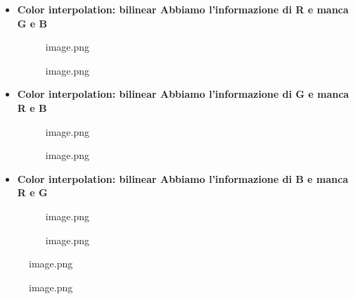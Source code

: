 \documentclass[
]{article}
\begin{document}
\begin{itemize}
\item
  \textbf{Color interpolation: bilinear
  Abbiamo l'informazione di R e manca G e B}

  \begin{figure}
  \centering
  {image.png}
  \caption{image.png}
  \end{figure}
\item
  \textbf{Color interpolation: bilinear
  Abbiamo l'informazione di G e manca R e B}

  \begin{figure}
  \centering
  {image.png}
  \caption{image.png}
  \end{figure}
\item
  \textbf{Color interpolation: bilinear
  Abbiamo l'informazione di B e manca R e G}

  \begin{figure}
  \centering
  {image.png}
  \caption{image.png}
  \end{figure}
\end{itemize}

\begin{figure}
\centering
{image.png}
\caption{image.png}
\end{figure}
\end{document}
